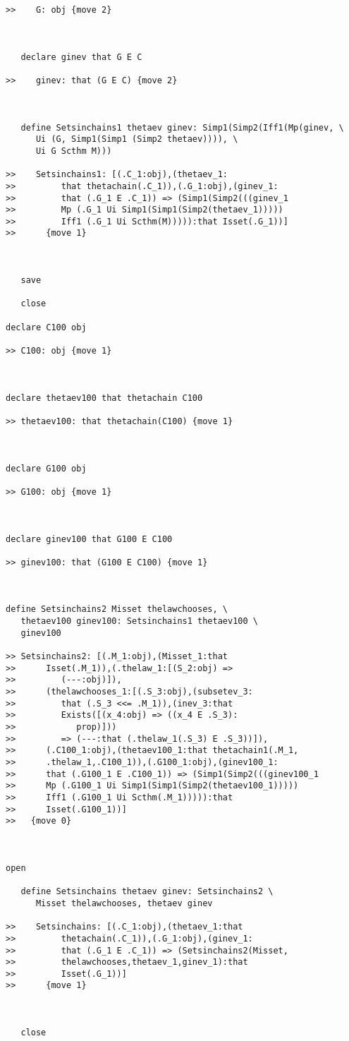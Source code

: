 \documentclass[12pt]{article}
\begin{document}
\begin{verbatim}
>>    G: obj {move 2}



   declare ginev that G E C

>>    ginev: that (G E C) {move 2}



   define Setsinchains1 thetaev ginev: Simp1(Simp2(Iff1(Mp(ginev, \
      Ui (G, Simp1(Simp1 (Simp2 thetaev)))), \
      Ui G Scthm M)))

>>    Setsinchains1: [(.C_1:obj),(thetaev_1:
>>         that thetachain(.C_1)),(.G_1:obj),(ginev_1:
>>         that (.G_1 E .C_1)) => (Simp1(Simp2(((ginev_1
>>         Mp (.G_1 Ui Simp1(Simp1(Simp2(thetaev_1)))))
>>         Iff1 (.G_1 Ui Scthm(M))))):that Isset(.G_1))]
>>      {move 1}



   save

   close

declare C100 obj

>> C100: obj {move 1}



declare thetaev100 that thetachain C100

>> thetaev100: that thetachain(C100) {move 1}



declare G100 obj

>> G100: obj {move 1}



declare ginev100 that G100 E C100

>> ginev100: that (G100 E C100) {move 1}



define Setsinchains2 Misset thelawchooses, \
   thetaev100 ginev100: Setsinchains1 thetaev100 \
   ginev100

>> Setsinchains2: [(.M_1:obj),(Misset_1:that
>>      Isset(.M_1)),(.thelaw_1:[(S_2:obj) =>
>>         (---:obj)]),
>>      (thelawchooses_1:[(.S_3:obj),(subsetev_3:
>>         that (.S_3 <<= .M_1)),(inev_3:that
>>         Exists([(x_4:obj) => ((x_4 E .S_3):
>>            prop)]))
>>         => (---:that (.thelaw_1(.S_3) E .S_3))]),
>>      (.C100_1:obj),(thetaev100_1:that thetachain1(.M_1,
>>      .thelaw_1,.C100_1)),(.G100_1:obj),(ginev100_1:
>>      that (.G100_1 E .C100_1)) => (Simp1(Simp2(((ginev100_1
>>      Mp (.G100_1 Ui Simp1(Simp1(Simp2(thetaev100_1)))))
>>      Iff1 (.G100_1 Ui Scthm(.M_1))))):that
>>      Isset(.G100_1))]
>>   {move 0}



open

   define Setsinchains thetaev ginev: Setsinchains2 \
      Misset thelawchooses, thetaev ginev

>>    Setsinchains: [(.C_1:obj),(thetaev_1:that
>>         thetachain(.C_1)),(.G_1:obj),(ginev_1:
>>         that (.G_1 E .C_1)) => (Setsinchains2(Misset,
>>         thelawchooses,thetaev_1,ginev_1):that
>>         Isset(.G_1))]
>>      {move 1}



   close
\end{verbatim}
\end{document}
